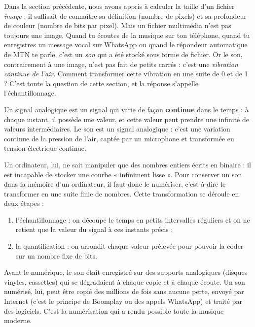 \documentclass[11pt]{article}
\newcommand{\cle}[1]{{\popxbold\color{popdark}#1}}
\newcounter{popsec}
\newcounter{popsub}
\newcommand{\courssub}[1]{%
  \stepcounter{popsub}%
  \par\vspace{9pt}\noindent{\popxbold\fontsize{11.5}{13}\selectfont\color{popink}{\color{poporange}\thepopsec.\thepopsub}\hspace{6pt}#1}\par\nopagebreak\vspace{4pt}
}
\begin{document}
Dans la section précédente, nous avons appris à calculer la taille d'un fichier \emph{image} : il suffisait de connaître sa définition (nombre de pixels) et sa profondeur de couleur (nombre de bits par pixel). Mais un fichier multimédia n'est pas toujours une image. Quand tu écoutes de la musique sur ton téléphone, quand tu enregistres un message vocal sur WhatsApp ou quand le répondeur automatique de MTN te parle, c'est un \emph{son} qui a été stocké sous forme de fichier. Or le son, contrairement à une image, n'est pas fait de petits carrés : c'est une \emph{vibration continue de l'air}. Comment transformer cette vibration en une suite de 0 et de 1 ? C'est toute la question de cette section, et la réponse s'appelle l'\cle{échantillonnage}.

\courssub{Le son : un signal analogique continu}

\begin{definition}
Un \cle{signal analogique} est un signal qui varie de façon \textbf{continue} dans le temps : à chaque instant, il possède une valeur, et cette valeur peut prendre une infinité de valeurs intermédiaires. Le son est un signal analogique : c'est une variation continue de la pression de l'air, captée par un microphone et transformée en tension électrique continue.
\end{definition}

Un ordinateur, lui, ne sait manipuler que des nombres entiers écrits en binaire : il est incapable de stocker une courbe « infiniment lisse ». Pour conserver un son dans la mémoire d'un ordinateur, il faut donc le \cle{numériser}, c'est-à-dire le transformer en une suite finie de nombres. Cette transformation se déroule en deux étapes :

\begin{enumerate}
\item l'\cle{échantillonnage} : on découpe le temps en petits intervalles réguliers et on ne retient que la valeur du signal à ces instants précis ;
\item la \cle{quantification} : on arrondit chaque valeur prélevée pour pouvoir la coder sur un nombre fixe de bits.
\end{enumerate}

\begin{savaistu}
Avant le numérique, le son était enregistré sur des supports analogiques (disques vinyles, cassettes) qui se dégradaient à chaque copie et à chaque écoute. Un son numérisé, lui, peut être copié des millions de fois sans aucune perte, envoyé par Internet (c'est le principe de Boomplay ou des appels WhatsApp) et traité par des logiciels. C'est la numérisation qui a rendu possible toute la musique moderne.
\end{savaistu}
\end{document}
